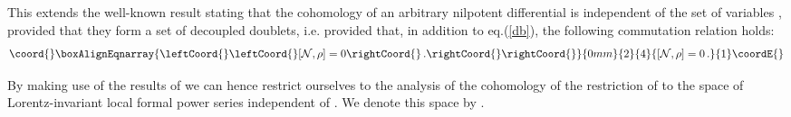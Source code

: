 \documentclass[a4paper,11pt]{article}
\begin{document}
This extends the well-known result \cite{Piguet:er,Barnich:2000zw}
stating that 
the cohomology of an arbitrary nilpotent differential \myHighlight{$\rho$}\coordHE{} is independent
of the set of variables \coordHE{}, provided that they form a set
of decoupled doublets, i.e. provided that, in addition to eq.(\ref{db}),
the following commutation relation holds:
%
\begin{eqnarray}\coord{}\boxAlignEqnarray{\leftCoord{}
\leftCoord{}[{\cal N},\rho] = 0 \rightCoord{}\, . \rightCoord{}
\label{a6_1}
\rightCoord{}}{0mm}{2}{4}{
[{\cal N},\rho] = 0 \, . 
}{1}\coordE{}\end{eqnarray}
%



By making use of the results of
\cite{Barnich:db,Barnich:mt,doppietti}
 we can hence restrict ourselves to the analysis
of the cohomology of the restriction \coordHE{} of
\coordHE{} to the space of Lorentz-invariant local formal power
series independent of \myHighlight{$(\lambda,\chi)$}\coordHE{}. We denote this space
by \coordHE{}.
\end{document}
